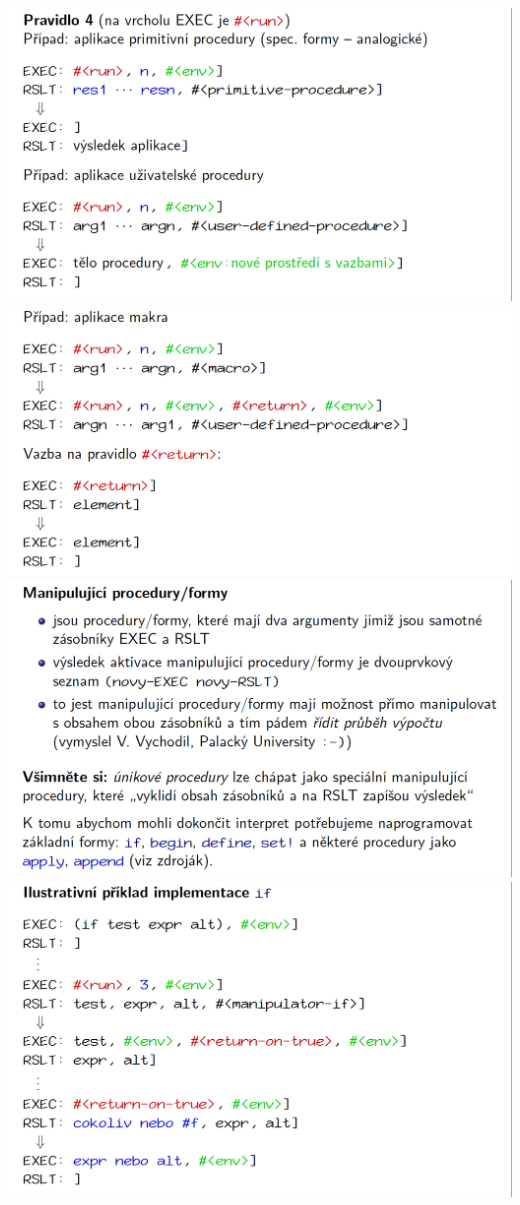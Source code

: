 \documentclass[10pt,a4paper]{article}
\begin{document}
\begin{center}
	\includegraphics[scale=0.3]{img/zasobnikovy_model_11}
	\includegraphics[scale=0.3]{img/zasobnikovy_model_12}
	\includegraphics[scale=0.3]{img/zasobnikovy_model_13}
	\includegraphics[scale=0.3]{img/zasobnikovy_model_14}
\end{center}
\end{document}
